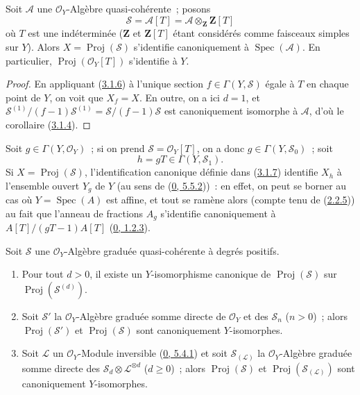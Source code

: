 \begin{corollary}[3.1.7]
\label{II.3.1.7-fr}
Soit $\mathcal{A}$ une $\mathcal{O}_Y$-Algèbre quasi-cohérente~; posons
\[
  \mathcal{S}=\mathcal{A}[T]
  =\mathcal{A}\otimes_{\mathbf{Z}}\mathbf{Z}[T]
\]
où $T$ est une indéterminée ($\mathbf{Z}$ et $\mathbf{Z}[T]$ étant
considérés comme faisceaux simples sur $Y$). Alors
$X=\operatorname{Proj}(\mathcal{S})$ s'identifie canoniquement à
$\operatorname{Spec}(\mathcal{A})$. En particulier,
$\operatorname{Proj}(\mathcal{O}_Y[T])$ s'identifie à $Y$.
\end{corollary}

\begin{proof}
En appliquant (\hyperref[II.3.1.6-fr]{3.1.6}) à l'unique section
$f\in\Gamma(Y,\mathcal{S})$ égale à $T$ en chaque point de $Y$, on voit que
$X_f=X$. En outre, on a ici $d=1$, et
$\mathcal{S}^{(1)}/(f-1)\mathcal{S}^{(1)}
=\mathcal{S}/(f-1)\mathcal{S}$ est canoniquement isomorphe à $\mathcal{A}$,
d'où le corollaire (\hyperref[II.3.1.4-fr]{3.1.4}).
\end{proof}

Soit $g\in\Gamma(Y,\mathcal{O}_Y)$~; si on prend
$\mathcal{S}=\mathcal{O}_Y[T]$, on a donc $g\in\Gamma(Y,\mathcal{S}_0)$~; soit
\[
  h=gT\in\Gamma(Y,\mathcal{S}_1).
\]
Si $X=\operatorname{Proj}(\mathcal{S})$, l'identification canonique définie
dans (\hyperref[II.3.1.7-fr]{3.1.7}) identifie $X_h$ à l'ensemble ouvert
$Y_g$ de $Y$ (au sens de (\hyperref[0.5.5.2-fr]{0, 5.5.2}))~: en effet, on
peut se borner au cas où $Y=\operatorname{Spec}(A)$ est affine, et tout se
ramène alors (compte tenu de (\hyperref[II.2.2.5-fr]{2.2.5})) au fait que
l'anneau de fractions $A_g$ s'identifie canoniquement à
$A[T]/(gT-1)A[T]$ (\hyperref[0.1.2.3-fr]{0, 1.2.3}).

\begin{proposition}[3.1.8]
\label{II.3.1.8-fr}
Soit $\mathcal{S}$ une $\mathcal{O}_Y$-Algèbre graduée quasi-cohérente à
degrés positifs.
\begin{enumerate}
  \item[\rm(i)] Pour tout $d>0$, il existe un $Y$-isomorphisme canonique de
    $\operatorname{Proj}(\mathcal{S})$ sur
    $\operatorname{Proj}(\mathcal{S}^{(d)})$.


  \item[\rm(ii)] Soit $\mathcal{S}'$ la $\mathcal{O}_Y$-Algèbre graduée
    somme directe de $\mathcal{O}_Y$ et des $\mathcal{S}_n$ ($n>0$)~;
    alors $\operatorname{Proj}(\mathcal{S}')$ et
    $\operatorname{Proj}(\mathcal{S})$ sont canoniquement $Y$-isomorphes.
  \item[\rm(iii)] Soit $\mathcal{L}$ un $\mathcal{O}_Y$-Module inversible
    (\hyperref[0.5.4.1-fr]{0, 5.4.1}) et soit $\mathcal{S}_{(\mathcal{L})}$ la
    $\mathcal{O}_Y$-Algèbre graduée somme directe des
    $\mathcal{S}_d\otimes\mathcal{L}^{\otimes d}$ ($d\geq0$)~; alors
    $\operatorname{Proj}(\mathcal{S})$ et
    $\operatorname{Proj}(\mathcal{S}_{(\mathcal{L})})$ sont canoniquement
    $Y$-isomorphes.
\end{enumerate}
\end{proposition}

